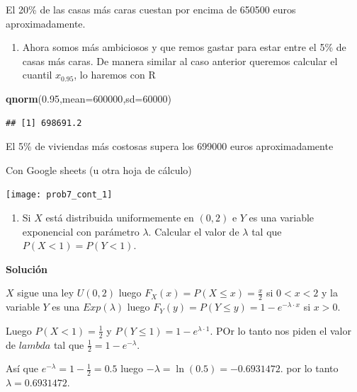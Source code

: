 \documentclass[
]{article}
\newenvironment{Shaded}{\begin{snugshade}}{\end{snugshade}}
\newcommand{\DataTypeTok}[1]{\textcolor[rgb]{0.13,0.29,0.53}{#1}}
\newcommand{\DecValTok}[1]{\textcolor[rgb]{0.00,0.00,0.81}{#1}}
\newcommand{\FloatTok}[1]{\textcolor[rgb]{0.00,0.00,0.81}{#1}}
\newcommand{\KeywordTok}[1]{\textcolor[rgb]{0.13,0.29,0.53}{\textbf{#1}}}
\newcommand{\NormalTok}[1]{#1}
\providecommand{\tightlist}{%
  \setlength{\itemsep}{0pt}\setlength{\parskip}{0pt}}
\begin{document}
El 20\% de las casas más caras cuestan por encima de 650500 euros
aproximadamente.

\begin{enumerate}
\def\labelenumi{\alph{enumi}.}
\setcounter{enumi}{2}
\tightlist
\item
  Ahora somos más ambiciosos y que remos gastar para estar entre el 5\%
  de casas más caras. De manera similar al caso anterior queremos
  calcular el cuantil \(x_{0.95}\), lo haremos con R
\end{enumerate}

\begin{Shaded}
\begin{Highlighting}[]
\KeywordTok{qnorm}\NormalTok{(}\FloatTok{0.95}\NormalTok{,}\DataTypeTok{mean=}\DecValTok{600000}\NormalTok{,}\DataTypeTok{sd=}\DecValTok{60000}\NormalTok{)}
\end{Highlighting}
\end{Shaded}

\begin{verbatim}
## [1] 698691.2
\end{verbatim}

El 5\% de viviendas más costosas supera los 699000 euros aproximadamente

Con Google sheets (u otra hoja de cálculo)

\texttt{[image: prob7\_cont\_1]}

\newpage

\begin{enumerate}
\def\labelenumi{\arabic{enumi}.}
\setcounter{enumi}{6}
\tightlist
\item
  Si \(X\) está distribuida uniformemente en \((0,2)\) e \(Y\) es una
  variable exponencial con parámetro \(\lambda\). Calcular el valor de
  \(\lambda\) tal que \(P(X<1)=P(Y<1)\).
\end{enumerate}

\textbf{Solución}

\(X\) sigue una ley \(U(0,2)\) luego \(F_X(x)=P(X\leq x)=\frac{x}{2}\)
si \(0<x<2\) y la variable \(Y\) es una \(Exp(\lambda)\) luego
\(F_Y(y)=P(Y\leq y)=1-e^{-\lambda\cdot x}\) si \(x>0\).

Luego \(P(X<1)=\frac{1}{2}\) y \(P(Y\leq 1)=1-e^{\lambda\cdot 1}\). POr
lo tanto nos piden el valor de \(lambda\) tal que
\(\frac{1}{2}=1-e^{-\lambda}\).

Así que \(e^{-\lambda}=1-\frac12=0.5\) luego
\(-\lambda=\ln(0.5)=-0.6931472.\) por lo tanto \(\lambda=0.6931472.\)
\end{document}
